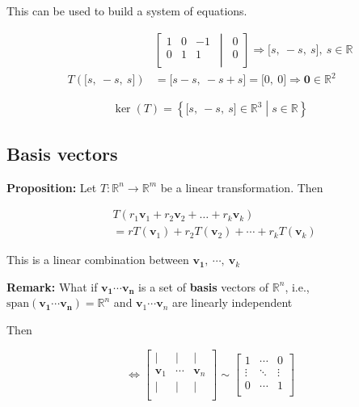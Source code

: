 \documentclass[12pt]{article}
\theoremstyle{plain}
\theoremstyle{remark}
\theoremstyle{definition}
\begin{document}
This can be used to build a system of equations.

\begin{align*}
&\left\lbrack \begin{matrix}1 & 0 & - 1 \\0 & 1 & 1 \\\end{matrix}\, \middle| \,\begin{matrix}0 \\0 \\\end{matrix} \right\rbrack \Rightarrow \lbrack s,\  - s,\ s\rbrack,\ s\mathbb{\in R} \\
T\left( \lbrack s,\  - s,\ s\rbrack \right) &= \lbrack s - s,\  - s + s\rbrack = \lbrack 0,\ 0\rbrack \Rightarrow \mathbf{0} \in \mathbb{R}^{2}
\end{align*}


\[\ker{(T)} = \left\{ \lbrack s,\  - s,\ s\rbrack \in \mathbb{R}^{3} \middle| s\mathbb{\in R} \right\}\]


\subsection{Basis vectors}

\textbf{Proposition:} Let
\(T:\mathbb{R}^{n} \rightarrow \mathbb{R}^{m}\) be a linear
transformation. Then

\begin{align*}
&T\left( r_{1}{\mathbf{v}}_{1} + r_{2}{\mathbf{v}}_{2} + \ldots + r_{k}{\mathbf{v}}_{k} \right) \\
&= rT\left( {\mathbf{v}}_{1} \right) + r_{2}T\left( {\mathbf{v}}_{2} \right) + \cdots + r_{k}T\left( {\mathbf{v}}_{k} \right)
\end{align*}


This is a linear combination between
\(\mathbf{v_{1}},\ \cdots,\ {\mathbf{v}}_{k}\)

\textbf{Remark:} What if \(\mathbf{v_{1}}\cdots\mathbf{v_{n}}\)
is a set of \textbf{basis} vectors of \(\mathbb{R}^{n}\), i.e.,
\(\text{span}\left( \mathbf{v_{1}}\cdots\mathbf{v_{n}} \right) = \mathbb{R}^{n}\)
and \({\mathbf{v}}_{1}\cdots{\mathbf{v}}_{n}\) are linearly
independent

Then

\[\Leftrightarrow \begin{bmatrix}
| & | & | \\
{\mathbf{v}}_{1} & \cdots & {\mathbf{v}}_{n} \\
| & | & | \\
\end{bmatrix}\sim\begin{bmatrix}
1 & \cdots & 0 \\
 \vdots & \ddots & \vdots \\
0 & \cdots & 1 \\
\end{bmatrix}\]
\end{document}
